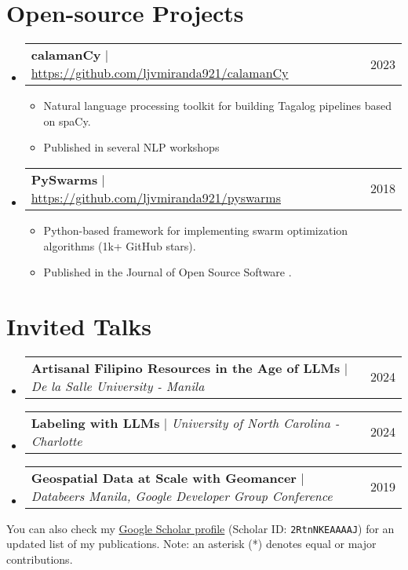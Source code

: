 \documentclass[a4paper,11pt]{article}
\makeatletter
\newcommand{\resumeItem}[1]{
  \item\small{
    {#1 \vspace{-2pt}}
  }
}
\newcommand{\resumeProjectHeading}[2]{
    \item
    \begin{tabular*}{0.97\textwidth}{l@{\extracolsep{\fill}}r}
      \small#1 & #2 \\
    \end{tabular*}\vspace{-7pt}
}
\newcommand{\resumeSubHeadingListStart}{\begin{itemize}[leftmargin=0.15in, label={}]}
\newcommand{\resumeSubHeadingListEnd}{\end{itemize}}
\newcommand{\resumeItemListStart}{\begin{itemize}}
\newcommand{\resumeItemListEnd}{\end{itemize}\vspace{-5pt}}
\makeatother
\begin{document}
\section{Open-source Projects}
\resumeSubHeadingListStart
\resumeProjectHeading
{\textbf{calamanCy} $|$ \url{https://github.com/ljvmiranda921/calamanCy}}{2023}
\resumeItemListStart
\resumeItem{Natural language processing toolkit for building Tagalog pipelines based on spaCy.}
\resumeItem{Published in several NLP workshops \cite{miranda2023calamancy,miranda2023developing}}
\resumeItemListEnd
\resumeProjectHeading
{\textbf{PySwarms} $|$ \url{https://github.com/ljvmiranda921/pyswarms}}{2018}
\resumeItemListStart
\resumeItem{Python-based framework for implementing swarm optimization algorithms (1k+ GitHub stars).}
\resumeItem{Published in the Journal of Open Source Software \cite{miranda2018pyswarms}.}
\resumeItemListEnd
\resumeSubHeadingListEnd

\section{Invited Talks}
\resumeSubHeadingListStart
\resumeProjectHeading
{\textbf{Artisanal Filipino Resources in the Age of LLMs} $|$ \emph{De la Salle University - Manila}}{2024}
\resumeProjectHeading
{\textbf{Labeling with LLMs} $|$ \emph{University of North Carolina - Charlotte}}{2024}
\resumeProjectHeading
{\textbf{Geospatial Data at Scale with Geomancer} $|$ \emph{Databeers Manila, Google Developer Group Conference}}{2019}
\resumeSubHeadingListEnd


\newpage
You can also check my \href{https://scholar.google.com/citations?user=2RtnNKEAAAAJ&hl=en}{Google Scholar profile}
(Scholar ID: \texttt{2RtnNKEAAAAJ})
for an updated list of my publications.
Note: an asterisk (*) denotes equal or major contributions.
\nocite{*}
{
  \small
  \newrefcontext[labelprefix=J]
  \printbibliography[keyword=journal,title=Journal Publications]
  \newrefcontext[labelprefix=C]
  \printbibliography[keyword=conference,title=Conference Papers]
  \newrefcontext[labelprefix=W]
  \printbibliography[keyword=workshop,title=Workshop Papers]
  \newrefcontext[labelprefix=P]
  \printbibliography[keyword=preprint,title=Preprints \& Technical Reports]
}

%   
%   


\end{document}
